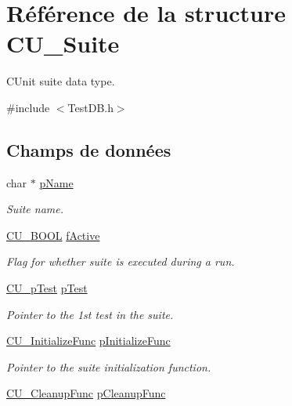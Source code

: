 \hypertarget{structCU__Suite}{\section{Référence de la structure C\-U\-\_\-\-Suite}
\label{structCU__Suite}
}


C\-Unit suite data type.  




{\ttfamily \#include $<$Test\-D\-B.\-h$>$}

\subsection*{Champs de données}
\begin{DoxyCompactItemize}
\item 
char $\ast$ \hyperlink{structCU__Suite_ac70274e00c1c5b7b6a8368c9a0ab6195}{p\-Name}
\begin{DoxyCompactList}\small\item\em Suite name. \end{DoxyCompactList}\item 
\hyperlink{group__Framework_gabd98d449e979a6379b06551242106dd4}{C\-U\-\_\-\-B\-O\-O\-L} \hyperlink{structCU__Suite_aeee5e5385d60b0d36b3e2507d4f579dc}{f\-Active}
\begin{DoxyCompactList}\small\item\em Flag for whether suite is executed during a run. \end{DoxyCompactList}\item 
\hyperlink{group__Framework_ga249c43fbe4e53452b3f90db1437da04b}{C\-U\-\_\-p\-Test} \hyperlink{structCU__Suite_ad56c4b9f273fdc8c3f504b62178dfdd6}{p\-Test}
\begin{DoxyCompactList}\small\item\em Pointer to the 1st test in the suite. \end{DoxyCompactList}\item 
\hyperlink{group__Framework_gaab4b8ad3aa3a3c222c43c8a330de11e3}{C\-U\-\_\-\-Initialize\-Func} \hyperlink{structCU__Suite_a572516b68f25492ac8e8ac720debfdb3}{p\-Initialize\-Func}
\begin{DoxyCompactList}\small\item\em Pointer to the suite initialization function. \end{DoxyCompactList}\item 
\hyperlink{group__Framework_ga90966c0bede742195897c3aeff4c342b}{C\-U\-\_\-\-Cleanup\-Func} \hyperlink{structCU__Suite_aee36fd856e07775ba3cbb91af2219c25}{p\-Cleanup\-Func}

\end{DoxyCompactItemize}
